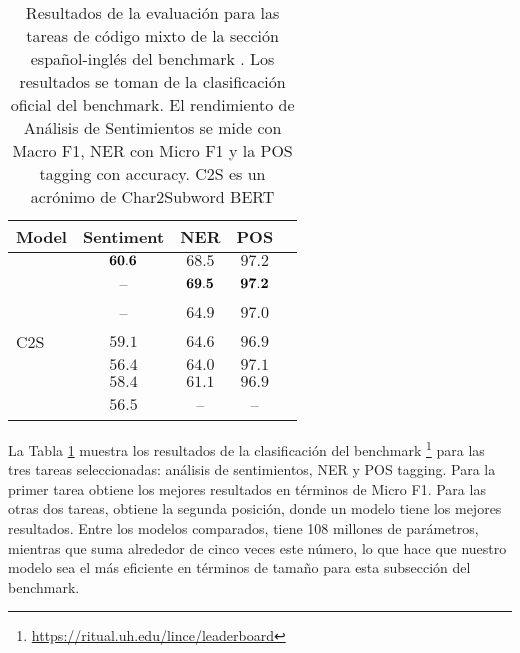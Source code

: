 \begin{table}[]
    \centering
    \begin{tabular}{lcccc}
        \hline
        Model                    & Sentiment       & NER                 & POS  \\
        \hline
        \robertuito{}            & $\mathbf{60.6}$    & $68.5$           & $97.2$     \\
        \xlmlarge{}              & --              & $\mathbf{69.5}$     & $\mathbf{97.2}$    \\
        \xlmbase{}               & --              & $64.9$           & $97.0$     \\
        C2S \mbert{}    & $59.1$          & $64.6$           & $96.9$     \\
        \mbert{}                 & $56.4$          & $64.0$           & $97.1$     \\
        \bert{}                  & $58.4$          & $61.1$           & $96.9$     \\
        \beto{}                  & $56.5$          & --               & --     \\
        \hline
    \end{tabular}
    \caption{Resultados de la evaluación para las tareas de código mixto de la sección español-inglés del benchmark \lince{}. Los resultados se toman de la clasificación oficial del benchmark. El rendimiento de Análisis de Sentimientos se mide con Macro F1, NER con Micro F1 y la POS tagging con accuracy. C2S es un acrónimo de Char2Subword BERT}
    \label{tab:lince_benchmark}
\end{table}


La Tabla \ref{tab:lince_benchmark} muestra los resultados de la clasificación del \lince{} benchmark \footnote{\url{https://ritual.uh.edu/lince/leaderboard}} para las tres tareas seleccionadas: análisis de sentimientos, NER y POS tagging. Para la primer tarea obtiene los mejores resultados en términos de Micro F1. Para las otras dos tareas, obtiene la segunda posición, donde un modelo \xlmlarge{} \cite{winata-etal-2021-multilingual} tiene los mejores resultados. Entre los modelos comparados, \robertuito{} tiene 108 millones de parámetros, mientras que \xlmlarge{} suma alrededor de cinco veces este número, lo que hace que nuestro modelo sea el más eficiente en términos de tamaño para esta subsección del benchmark.
